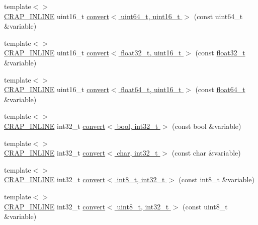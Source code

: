 \begin{DoxyCompactItemize}
\item 
{\footnotesize template$<$$>$ }\\\hyperlink{config__x86_8h_a5a40526b8d842e7ff731509998bb0f1c}{C\+R\+A\+P\+\_\+\+I\+N\+L\+I\+N\+E} uint16\+\_\+t \hyperlink{namespacecrap_a0823edb57f60d854502e8657336885c7}{convert$<$ uint64\+\_\+t, uint16\+\_\+t $>$} (const uint64\+\_\+t \&variable)
\item 
{\footnotesize template$<$$>$ }\\\hyperlink{config__x86_8h_a5a40526b8d842e7ff731509998bb0f1c}{C\+R\+A\+P\+\_\+\+I\+N\+L\+I\+N\+E} uint16\+\_\+t \hyperlink{namespacecrap_a46867334dcd3612b887bc34782c0992d}{convert$<$ float32\+\_\+t, uint16\+\_\+t $>$} (const \hyperlink{crap__types_8h_a4611b605e45ab401f02cab15c5e38715}{float32\+\_\+t} \&variable)
\item 
{\footnotesize template$<$$>$ }\\\hyperlink{config__x86_8h_a5a40526b8d842e7ff731509998bb0f1c}{C\+R\+A\+P\+\_\+\+I\+N\+L\+I\+N\+E} uint16\+\_\+t \hyperlink{namespacecrap_a188e5ce3c38547ceb32c29c98355d2ae}{convert$<$ float64\+\_\+t, uint16\+\_\+t $>$} (const \hyperlink{crap__types_8h_ac55f3ae81b5bc9053760baacf57e47f4}{float64\+\_\+t} \&variable)
\item 
{\footnotesize template$<$$>$ }\\\hyperlink{config__x86_8h_a5a40526b8d842e7ff731509998bb0f1c}{C\+R\+A\+P\+\_\+\+I\+N\+L\+I\+N\+E} int32\+\_\+t \hyperlink{namespacecrap_ae4a5dec504507fdfb398209926179fd0}{convert$<$ bool, int32\+\_\+t $>$} (const bool \&variable)
\item 
{\footnotesize template$<$$>$ }\\\hyperlink{config__x86_8h_a5a40526b8d842e7ff731509998bb0f1c}{C\+R\+A\+P\+\_\+\+I\+N\+L\+I\+N\+E} int32\+\_\+t \hyperlink{namespacecrap_a02f18134afb81a7e30e7abd5f617d716}{convert$<$ char, int32\+\_\+t $>$} (const char \&variable)
\item 
{\footnotesize template$<$$>$ }\\\hyperlink{config__x86_8h_a5a40526b8d842e7ff731509998bb0f1c}{C\+R\+A\+P\+\_\+\+I\+N\+L\+I\+N\+E} int32\+\_\+t \hyperlink{namespacecrap_a6314ccc10474c864f3f5ef27bf404f86}{convert$<$ int8\+\_\+t, int32\+\_\+t $>$} (const int8\+\_\+t \&variable)
\item 
{\footnotesize template$<$$>$ }\\\hyperlink{config__x86_8h_a5a40526b8d842e7ff731509998bb0f1c}{C\+R\+A\+P\+\_\+\+I\+N\+L\+I\+N\+E} int32\+\_\+t \hyperlink{namespacecrap_a4750f4cab8dbfe70d56225397f2628f1}{convert$<$ uint8\+\_\+t, int32\+\_\+t $>$} (const uint8\+\_\+t \&variable)

\end{DoxyCompactItemize}

